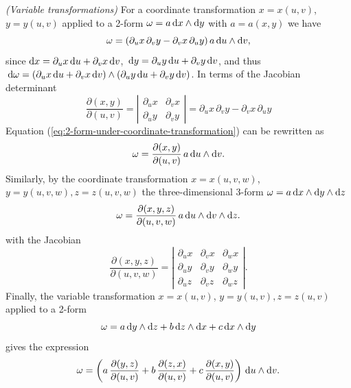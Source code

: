 \begin{beispiel}
	\emph{(Variable transformations)}
	\cite[307-310]{Teubner-Taschenbuch-1}
	For a coordinate transformation $x = x(u, v)$, $y = y(u,v)$ applied to a 2-form $\omega = a \,\mathrm{d} x \wedge \mathrm{d} y$ with $a = a(x,y)$ we have
	\begin{equation}
		\omega = (\partial_u x \, \partial_v y - \partial_v x \, \partial_u y) \, a \,\mathrm{d} u \wedge \mathrm{d} v
		,
		\label{eq:2-form-under-coordinate-transformation}
	\end{equation}
	since $\mathrm{d} x = \partial_u x \,\mathrm{d} u + \partial_v x \,\mathrm{d} v$,
	$\,\mathrm{d} y = \partial_u y \,\mathrm{d} u + \partial_v y \,\mathrm{d} v$, and thus
	$\,\mathrm{d} \omega 
	= (\partial_u x \,\mathrm{d} u + \partial_v x \,\mathrm{d} v) 
	\wedge (\partial_u y \,\mathrm{d} u + \partial_v y \,\mathrm{d} v)$.
	In terms of the Jacobian determinant
	\[
		\frac{\partial (x,y)}{\partial (u,v)} 
		= \left|\begin{array}{cc}
			\partial_u x & \partial_v x \\
			\partial_u y & \partial_v y 
		\end{array}\right|
		= \partial_u x \, \partial_v y - \partial_v x \, \partial_u y
	\]
	Equation (\ref{eq:2-form-under-coordinate-transformation}) can be rewritten as
	\begin{equation}
		\omega = \frac{\partial (x,y)}{\partial (u,v)} \, a \,\mathrm{d} u \wedge \mathrm{d} v
		.
		\label{eq:2-form-under-coordinate-transformation-with-Jacobian}
	\end{equation}
	Similarly, by the coordinate transformation
	$x = x(u, v, w)$, $y = y(u,v,w), z = z(u,v,w)$
	the three-dimensional 3-form $\omega = a \,\mathrm{d} x \wedge \mathrm{d} y \wedge \mathrm{d} z$
	\begin{equation}
		\omega = \frac{\partial (x,y,z)}{\partial (u,v,w)} \, a \,\mathrm{d} u \wedge \mathrm{d} v \wedge \mathrm{d} z
		.
		\label{eq:3-form-under-coordinate-transformation-with-Jacobian}
	\end{equation}
	with the Jacobian
	\[
		\frac{\partial (x,y,z)}{\partial (u,v,w)} 
		= \left|\begin{array}{ccc}
			\partial_u x & \partial_v x & \partial_w x \\
			\partial_u y & \partial_v y & \partial_w y \\
			\partial_u z & \partial_v z & \partial_w z 
		\end{array}\right|
		.
	\]
	Finally, the variable transformation
	$x = x(u, v)$, $y = y(u,v), z = z(u,v)$
	applied to a 2-form
	\begin{equation*}
		\omega
		= a \,\mathrm{d} y \wedge \mathrm{d} z + b \,\mathrm{d} z \wedge \mathrm{d} x + c \,\mathrm{d} x \wedge \mathrm{d} y 
	\end{equation*}
	gives the expression
	\begin{equation}
		\omega
		= \left(
			  a \, \frac{\partial (y,z)}{\partial (u,v)}
			+ b \, \frac{\partial (z,x)}{\partial (u,v)}
			+ c \, \frac{\partial (x,y)}{\partial (u,v)}
		\right)
		\,\mathrm{d} u \wedge \mathrm{d} v
		. 
	\end{equation}	
\end{beispiel}


